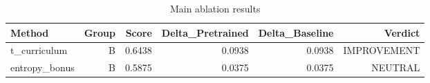 \begin{table}[htbp]
\centering
\caption{Main ablation results}
\label{tab:main-results}
\begin{tabular}{lrrrrr}
\toprule
\textbf{Method} & \textbf{Group} & \textbf{Score} & \textbf{Delta\_Pretrained} & \textbf{Delta\_Baseline} & \textbf{Verdict} \\
\midrule
t\_curriculum & B & 0.6438 & 0.0938 & 0.0938 & IMPROVEMENT \\
entropy\_bonus & B & 0.5875 & 0.0375 & 0.0375 & NEUTRAL \\
\bottomrule
\end{tabular}
\end{table}